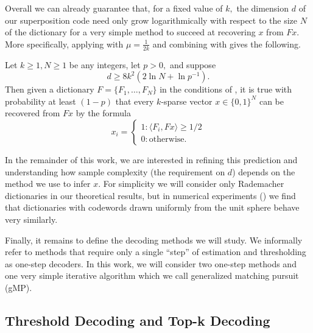 Overall we can already guarantee that, for a fixed value of $k,$ the dimension $d$ of our superposition code need only grow logarithmically with respect to the size $N$ of the dictionary for a very simple method to succeed at recovering $x$ from $F x.$ More specifically, applying  with $\mu = \tfrac1{2k}$ and combining with  gives the following.

\begin{corollary}
	Let $k \ge 1, N \ge 1$ be any integers, let $p > 0,$ and suppose
	$$
	d \ge 8 k^2 (2 \ln N + \ln p^{-1}).
	$$
	Then given a dictionary $F = \{ F_1, \dots, F_N \}$ in the conditions of , it is true with probability at least $(1 - p)$ that every $k$-sparse vector $x \in \{0, 1\}^N$ can be recovered from $F x$ by the formula
	$$
	x_i = \begin{cases}
 	  1 \colon \langle F_i, F x \rangle \ge 1/2 \\
 	  0 \colon \text{otherwise.}
    \end{cases}
	$$
\end{corollary}

In the remainder of this work, we are interested in refining this prediction and understanding how sample complexity (the requirement on $d$) depends on the method we use to infer $x.$ For simplicity we will consider only Rademacher dictionaries in our theoretical results, but in numerical experiments () we find that dictionaries with codewords drawn uniformly from the unit sphere behave very similarly.

Finally, it remains to define the decoding methods we will study. We informally refer to methods that require only a single ``step'' of estimation and thresholding as one-step decoders. In this work, we will consider two one-step methods and one very simple iterative algorithm which we call generalized matching pursuit (gMP).

\subsection{Threshold Decoding and Top-k Decoding \label{sec:threshold-top-k}}

